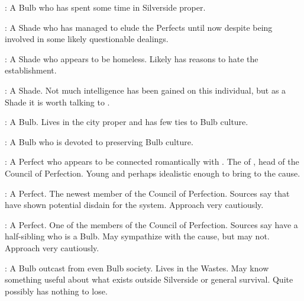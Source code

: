 \documentclass[blue]{Silversiders}
\begin{document}
\begin{itemz}
	\item \cBeauty{}: A \cBeauty{\sex} Bulb who has spent some time in Silverside proper.
	\item \cTrickster{}: A \cTrickster{\sex} Shade who has managed to elude the Perfects until now despite being involved in some likely questionable dealings.
	\item \cWisdom{}: A \cWisdom{\sex} Shade who appears to be homeless. Likely has reasons to hate the establishment.
	\item \cTraitor{}: A \cTraitor{\sex} Shade. Not much intelligence has been gained on this individual, but as a Shade it is worth talking to \cTraitor{\them}.
	\item \cOracle{}: A \cOracle{\sex} Bulb. Lives in the city proper and has few ties to Bulb culture.
	\item \cHonor{}: A \cHonor{\sex} Bulb who is devoted to preserving Bulb culture.
	\item \cTruth{}: A \cTruth{\sex} Perfect who appears to be connected romantically with \cWisdom{}. The \cTruth{\offspring} of \cDeath{}, head of the Council of Perfection. Young and perhaps idealistic enough to bring to the cause.
	\item \cFamine{}: A \cFamine{\sex} Perfect. The newest member of the Council of Perfection. Sources say that \cFamine{\they} have shown potential disdain for the system. Approach very cautiously.
	\item \cPestilence{}: A \cPestilence{\sex} Perfect. One of the members of the Council of Perfection. Sources say \cPestilence{\they} have a half-sibling who is a Bulb. May sympathize with the cause, but may not. Approach very cautiously.
	\item \cOutcast{}: A \cOutcast{\sex} Bulb outcast from even Bulb society. Lives in the Wastes. May know something useful about what exists outside Silverside or general survival. Quite possibly has nothing to lose.				
\end{itemz}
\end{document}
